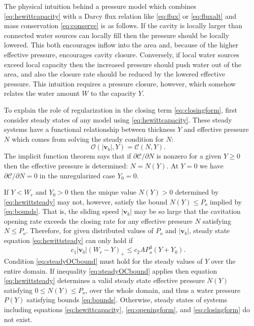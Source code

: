 \documentclass[11pt,final]{amsart}%
\newcommand\bv{\mathbf{v}}
\begin{document}
The physical intuition behind a pressure model which combines \eqref{eq:hewittcapacity} with a Darcy flux relation like \eqref{eq:flux} or \eqref{eq:fluxalt} and mass conservation \eqref{eq:conserve} is as follows.  If the cavity is locally larger than connected water sources can locally fill then the pressure should be locally lowered.  This both encourages inflow into the area and, because of the higher effective pressure, encourages cavity closure.  Conversely, if local water sources exceed local capacity then the increased pressure should push water out of the area, and also the closure rate should be reduced by the lowered effective pressure.  This intuition requires a pressure closure, however, which somehow relates the water amount $W$ to the capacity $Y$.

To explain the role of regularization in the closing term \eqref{eq:closingform}, first consider steady states of any model using \eqref{eq:hewittcapacity}.  These steady systems have a functional relationship between thickness $Y$ and effective pressure $N$ which comes from solving the steady condition for $N$:
\begin{equation}
\mathcal{O}(|\bv_b|,Y) = \mathcal{C}(N,Y). \label{eq:hewittsteady}
\end{equation}
The implicit function theorem says that if $\partial\mathcal{C}/\partial N$ is nonzero for a given $Y\ge 0$ then the effective pressure is determined: $N=N(Y)$.  At $Y=0$ we have $\partial\mathcal{C}/\partial N=0$ in the unregularized case $Y_0=0$.

If $Y<W_r$ and $Y_0>0$ then the unique value $N(Y)>0$ determined by \eqref{eq:hewittsteady} may not, however, satisfy the bound $N(Y) \le P_o$ implied by \eqref{eq:bounds}.  That is, the sliding speed $|\bv_b|$ may be so large that the cavitation opening rate exceeds the closing rate for any effective pressure $N$ satisfying $N\le P_o$.  Therefore, for given distributed values of $P_o$ and $|\bv_b|$, steady state equation \eqref{eq:hewittsteady} can only hold if
\begin{equation}
c_1 |\bv_b| (W_r - Y)_+ \le c_2 A P_o^3 (Y+Y_0). \label{eq:steadyOCbound}
\end{equation}
Condition \eqref{eq:steadyOCbound} must hold for the steady values of $Y$ over the entire domain.  If inequality \eqref{eq:steadyOCbound} applies then equation \eqref{eq:hewittsteady} determines a valid steady state effective pressure $N(Y)$ satisfying $0\le N(Y) \le P_o$, over the whole domain, and thus a water pressure $P(Y)$ satisfying bounds \eqref{eq:bounds}.  Otherwise, steady states of systems including equations \eqref{eq:hewittcapacity}, \eqref{eq:openingform}, and \eqref{eq:closingform} do not exist.
\end{document}
